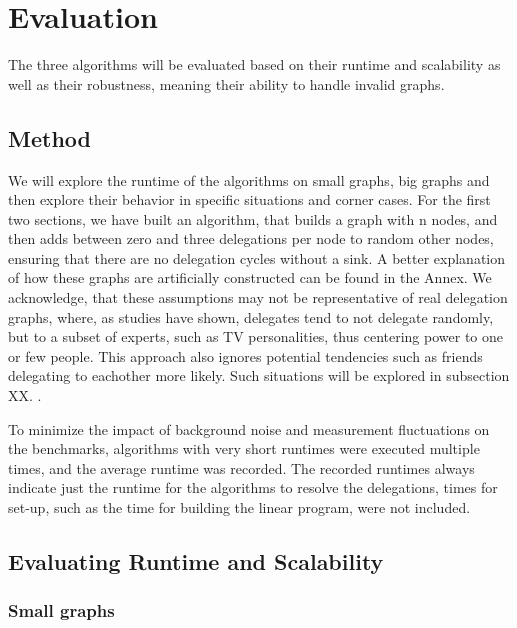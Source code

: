 \graphicspath{ {./figures/} }

\chapter{Evaluation}

The three algorithms will be evaluated based on their runtime and scalability as well as their robustness, meaning their ability to handle invalid graphs. 

\section{Method}

We will explore the runtime of the algorithms on small graphs, big graphs and then explore their behavior in specific situations and corner cases. For the first two sections, we have built an algorithm, that builds a graph with n nodes, and then adds between zero and three delegations per node to random other nodes, ensuring that there are no delegation cycles without a sink. A better explanation of how these graphs are artificially constructed can be found in the Annex.  We acknowledge, that these assumptions may not be representative of real delegation graphs, where, as studies have shown, delegates tend to not delegate randomly, but to a subset of experts, such as TV personalities, thus centering power to one or few people. This approach also ignores potential tendencies such as friends delegating to eachother more likely. Such situations will be explored in subsection XX. .

To minimize the impact of background noise and measurement fluctuations on the benchmarks, algorithms with very short runtimes were executed multiple times, and the average runtime was recorded. The recorded runtimes always indicate just the runtime for the algorithms to resolve the delegations, times for set-up, such as the time for building the linear program, were not included. 

\section{Evaluating Runtime and Scalability}

\subsection{Small graphs}
\label{subsec:small_graphs}


